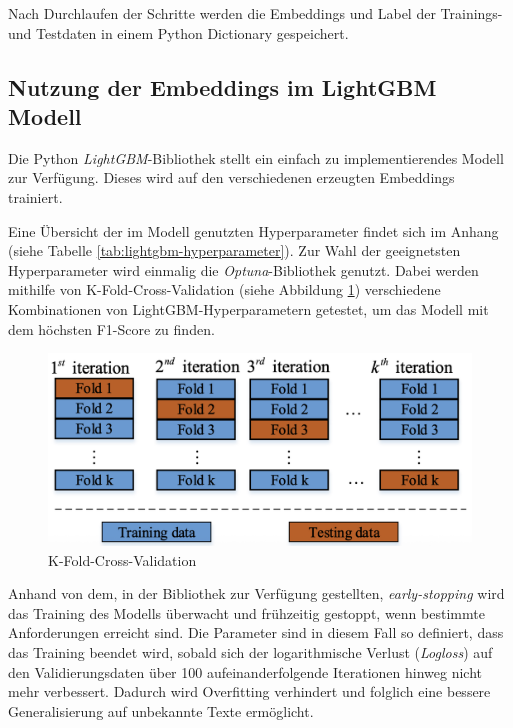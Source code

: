 Nach Durchlaufen der Schritte werden die Embeddings und Label der Trainings- und Testdaten in einem Python Dictionary gespeichert.

\subsection{Nutzung der Embeddings im LightGBM Modell}

Die Python \textit{LightGBM}-Bibliothek stellt ein einfach zu implementierendes Modell zur Verfügung.
Dieses wird auf den verschiedenen erzeugten Embeddings trainiert.

Eine Übersicht der im Modell genutzten Hyperparameter findet sich im Anhang (siehe Tabelle \ref{tab:lightgbm-hyperparameter}).
Zur Wahl der geeignetsten Hyperparameter wird einmalig die \textit{Optuna}-Bibliothek genutzt.
Dabei werden mithilfe von K-Fold-Cross-Validation (siehe Abbildung \ref{fig:k-fold_cross-validation}) verschiedene Kombinationen von LightGBM-Hyperparametern getestet, 
um das Modell mit dem höchsten F1-Score zu finden.

\begin{figure}[htbp]
    \begin{center}
        \includegraphics[scale=0.4]{static/k-fold_cross-validation.png}
        \caption{\label{fig:k-fold_cross-validation} K-Fold-Cross-Validation \cite{isaac2021}}
    \end{center}
\end{figure}

Anhand von dem, in der Bibliothek zur Verfügung gestellten, \textit{early-stopping} wird das Training des Modells überwacht und frühzeitig gestoppt, wenn bestimmte 
Anforderungen erreicht sind. 
Die Parameter sind in diesem Fall so definiert, dass das Training beendet wird, sobald sich der logarithmische Verlust (\textit{Logloss}) auf den 
Validierungsdaten über 100 aufeinanderfolgende Iterationen hinweg nicht mehr verbessert.
Dadurch wird Overfitting verhindert und folglich eine bessere Generalisierung auf unbekannte Texte ermöglicht.

